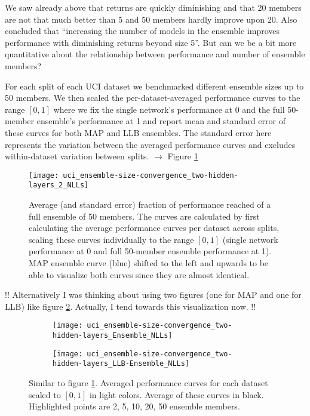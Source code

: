 \documentclass[../thesis.tex]{subfiles}
\begin{document}
We saw already above that returns are quickly diminishing and that 20 members are not that much better than 5 and 50 members hardly improve upon 20. Also \textcite{ovadia2019can} concluded that ``increasing the number of models in the ensemble improves performance with diminishing returns beyond size 5''.
But can we be a bit more quantitative about the relationship between performance and number of ensemble members?
\bigskip

For each split of each UCI dataset we benchmarked different ensemble sizes up to 50 members. We then scaled the per-dataset-averaged performance curves to the range $[0, 1]$ where we fix the single network's performance at 0 and the full 50-member ensemble's performance at 1 and report mean and standard error of these curves for both MAP and LLB ensembles. The standard error here represents the variation between the averaged performance curves and excludes within-dataset variation between splits. $\rightarrow$ Figure \ref{fig:uci-ensemble-sizes}
\bigskip

\begin{figure}
    \centering
    \texttt{[image: uci\_ensemble-size-convergence\_two-hidden-layers\_2\_NLLs]} 
    \caption{Average (and standard error) fraction of performance reached of a full ensemble of 50 members. The curves are calculated by first calculating the average performance curves per dataset across splits, scaling these curves individually to the range $[0, 1]$ (single network performance at 0 and full 50-member ensemble performance at 1). MAP ensemble curve (blue) shifted to the left and upwards to be able to visualize both curves since they are almost identical.}
    \label{fig:uci-ensemble-sizes}
\end{figure}

!! Alternatively I was thinking about using two figures (one for MAP and one for LLB) like figure \ref{fig:uci-ensemble-sizes-alternative}. Actually, I tend towards this visualization now. !!

\begin{figure}
    \centering
    \begin{subfigure}{\textwidth}
    \texttt{[image: uci\_ensemble-size-convergence\_two-hidden-layers\_Ensemble\_NLLs]} 
    \end{subfigure}
    \begin{subfigure}{\textwidth}
    \texttt{[image: uci\_ensemble-size-convergence\_two-hidden-layers\_LLB-Ensemble\_NLLs]} 
    \end{subfigure}
    \caption{Similar to figure \ref{fig:uci-ensemble-sizes}. Averaged performance curves for each dataset scaled to $[0, 1]$ in light colors. Average of these curves in black. Highlighted points are 2, 5, 10, 20, 50 ensemble members. }
    \label{fig:uci-ensemble-sizes-alternative}
    
\end{figure}
\end{document}
